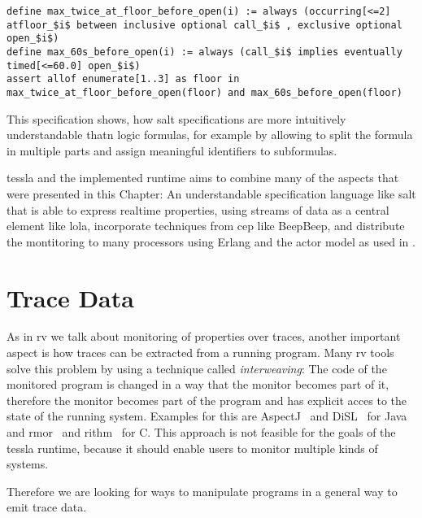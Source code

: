 \begin{lstlisting}[float,breaklines=true,label=listing:salt_example,caption={[Example \gls{salt} specification with realtime operators]An example specification in the \gls{salt} language taken from \cite{Bauer2006} defining behaviour of an elevator.}]
define max_twice_at_floor_before_open(i) := always (occurring[<=2] atfloor_$i$ between inclusive optional call_$i$ , exclusive optional open_$i$)
define max_60s_before_open(i) := always (call_$i$ implies eventually timed[<=60.0] open_$i$)
assert allof enumerate[1..3] as floor in max_twice_at_floor_before_open(floor) and max_60s_before_open(floor)
\end{lstlisting}

This specification shows, how \gls{salt} specifications are more intuitively understandable thatn logic formulas, for example by allowing to split the formula in multiple parts and assign meaningful identifiers to subformulas.

\Gls{tessla} and the implemented runtime aims to combine many of the aspects that were presented in this Chapter: An understandable specification language like \gls{salt} that is able to express realtime properties, using streams of data as a central element like \gls{lola}, incorporate techniques from \gls{cep} like BeepBeep, and distribute the montitoring to many processors using Erlang and the actor model as used in \cite{Attard2016}.

\section{Trace Data}
\label{sec:related:traces}

As in \gls{rv} we talk about monitoring of properties over traces, another important aspect is how traces can be extracted from a running program.
Many \gls{rv} tools solve this problem by using a technique called \emph{interweaving}: The code of the monitored program is changed in a way that the monitor becomes part of it, therefore the monitor becomes part of the program and has explicit acces to the state of the running system.
Examples for this are AspectJ~\cite{Kiczales2001} and DiSL~\cite{Marek2012} for Java and \gls{rmor}~\cite{Havelund2008} and \gls{rithm}~\cite{Navabpour2013} for C.
This approach is not feasible for the goals of the \gls{tessla} runtime, because it should enable users to monitor multiple kinds of systems.

Therefore we are looking for ways to manipulate programs in a general way to emit trace data.

